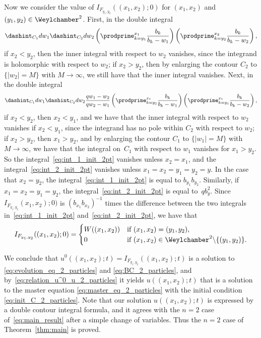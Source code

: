 Now we consider the value of $I_{F_{y_1, y_2}}((x_1, x_2); 0)$ for $(x_1, x_2)$ and $(y_1, y_2) \in \Weylchamber^2$. First, in the double integral
\begin{gather} \label{eq:int_1_init_2pt}
 \dashint_{C_1} dw_1 \dashint_{C_2} dw_2 \left( \prodprime^{x_1}_{k = y_1} \frac{b_k}{b_k - w_1} \right) \left( \prodprime^{x_2}_{k = y_2} \frac{b_k}{b_k - w_2} \right),
\end{gather}
if $x_2 < y_2$, then the inner integral with respect to $w_2$ vanishes, since the integrand is holomorphic with respect to $w_2$; if $x_2 > y_2$, then by enlarging the contour $C_2$ to $\{ \lvert w_2 \rvert = M \}$ with $M \to \infty$, we still have that the inner integral vanishes. Next, in the double integral
\begin{gather} \label{eq:int_2_init_2pt}
 \dashint_{C_1} dw_1 \dashint_{C_2} dw_2 \frac{qw_1 - w_2}{qw_2 - w_1} \left( \prodprime^{x_1}_{k = y_2} \frac{b_k}{b_k - w_1} \right) \left( \prodprime^{x_1}_{k = y_1} \frac{b_k}{b_k - w_2} \right),
\end{gather}
if $x_2 < y_2$, then $x_2 < y_1$, and we have that the inner integral with respect to $w_2$ vanishes if $x_2 < y_1$, since the integrand has no pole within $C_2$ with respect to $w_2$; if $x_2 > y_2$, then $x_1 > y_2$, and by enlarging the contour $C_1$ to $\{ \lvert w_1 \rvert = M \}$ with $M \to \infty$, we have that the integral on~$C_1$ with respect to $w_1$ vanishes for $x_1 > y_2$. So the integral~\eqref{eq:int_1_init_2pt} vanishes unless $x_2 = x_1$, and the integral~\eqref{eq:int_2_init_2pt} vanishes unless $x_1 = x_2 = y_1 = y_2 = y$. In the case that $x_2 = y_2$, the integral~\eqref{eq:int_1_init_2pt} is equal to $b_{y_1} b_{y_2}$. Similarly, if $x_1 = x_2 = y_1 = y_2$, the integral~\eqref{eq:int_2_init_2pt} is equal to~$q b^2_y$. Since $I_{F_{y_1, y_2}}(x_1, x_2); 0)$ is $(b_{x_1} b_{x_2})^{-1}$ times the dif\/ference between the two integrals in~\eqref{eq:int_1_init_2pt} and~\eqref{eq:int_2_init_2pt}, we have that
\begin{gather*}
 I_{F_{y_1, y_2}}((x_1, x_2); 0) =
 \begin{cases}
 W((x_1, x_2)) & \text{if $(x_1, x_2) = (y_1, y_2)$}, \\
 0 & \text{if $(x_1, x_2) \in \Weylchamber^2 {\setminus} \{ (y_1, y_2) \}$}.
 \end{cases}
\end{gather*}

We conclude that $u^0((x_1, x_2); t) = I_{F_{y_1, y_2}}((x_1, x_2); t)$ is a solution to \eqref{eq:evolution_eq_2_particles} and \eqref{eq:BC_2_particles}, and by~\eqref{eq:relation_u^0_u_2_particles} it yields $u((x_1, x_2); t)$ that is a solution to the master equation \eqref{eq:master_eq_2_particles} with the initial condition \eqref{eq:init_C_2_particles}. Note that our solution $u((x_1, x_2); t)$ is expressed by a double contour integral formula, and it agrees with the $n = 2$ case of~\eqref{eq:main_result} after a simple change of variables. Thus the $n = 2$ case of Theorem~\ref{thm:main} is proved.

